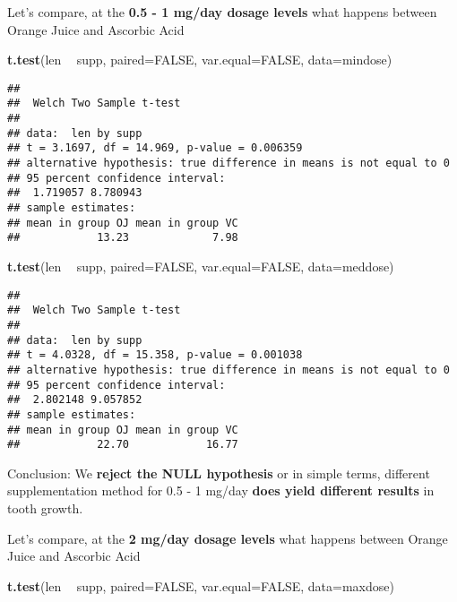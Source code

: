 \documentclass[]{article}
\newenvironment{Shaded}{\begin{snugshade}}{\end{snugshade}}
\newcommand{\DataTypeTok}[1]{\textcolor[rgb]{0.13,0.29,0.53}{#1}}
\newcommand{\KeywordTok}[1]{\textcolor[rgb]{0.13,0.29,0.53}{\textbf{#1}}}
\newcommand{\NormalTok}[1]{#1}
\newcommand{\OperatorTok}[1]{\textcolor[rgb]{0.81,0.36,0.00}{\textbf{#1}}}
\newcommand{\OtherTok}[1]{\textcolor[rgb]{0.56,0.35,0.01}{#1}}
\newcommand{\StringTok}[1]{\textcolor[rgb]{0.31,0.60,0.02}{#1}}
\begin{document}
Let's compare, at the \textbf{0.5 - 1 mg/day dosage levels} what happens
between Orange Juice and Ascorbic Acid

\begin{Shaded}
\begin{Highlighting}[]
\KeywordTok{t.test}\NormalTok{(len }\OperatorTok{~}\StringTok{ }\NormalTok{supp, }\DataTypeTok{paired=}\OtherTok{FALSE}\NormalTok{, }\DataTypeTok{var.equal=}\OtherTok{FALSE}\NormalTok{, }\DataTypeTok{data=}\NormalTok{mindose)}
\end{Highlighting}
\end{Shaded}

\begin{verbatim}
## 
##  Welch Two Sample t-test
## 
## data:  len by supp
## t = 3.1697, df = 14.969, p-value = 0.006359
## alternative hypothesis: true difference in means is not equal to 0
## 95 percent confidence interval:
##  1.719057 8.780943
## sample estimates:
## mean in group OJ mean in group VC 
##            13.23             7.98
\end{verbatim}

\begin{Shaded}
\begin{Highlighting}[]
\KeywordTok{t.test}\NormalTok{(len }\OperatorTok{~}\StringTok{ }\NormalTok{supp, }\DataTypeTok{paired=}\OtherTok{FALSE}\NormalTok{, }\DataTypeTok{var.equal=}\OtherTok{FALSE}\NormalTok{, }\DataTypeTok{data=}\NormalTok{meddose)}
\end{Highlighting}
\end{Shaded}

\begin{verbatim}
## 
##  Welch Two Sample t-test
## 
## data:  len by supp
## t = 4.0328, df = 15.358, p-value = 0.001038
## alternative hypothesis: true difference in means is not equal to 0
## 95 percent confidence interval:
##  2.802148 9.057852
## sample estimates:
## mean in group OJ mean in group VC 
##            22.70            16.77
\end{verbatim}

Conclusion: We \textbf{reject the NULL hypothesis} or in simple terms,
different supplementation method for 0.5 - 1 mg/day \textbf{does yield
different results} in tooth growth.

Let's compare, at the \textbf{2 mg/day dosage levels} what happens
between Orange Juice and Ascorbic Acid

\begin{Shaded}
\begin{Highlighting}[]
\KeywordTok{t.test}\NormalTok{(len }\OperatorTok{~}\StringTok{ }\NormalTok{supp, }\DataTypeTok{paired=}\OtherTok{FALSE}\NormalTok{, }\DataTypeTok{var.equal=}\OtherTok{FALSE}\NormalTok{, }\DataTypeTok{data=}\NormalTok{maxdose)}
\end{Highlighting}
\end{Shaded}
\end{document}
